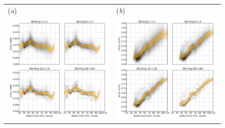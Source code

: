 \documentclass[preprint]{aastex}
\begin{document}
\begin{figure}[p]
  \begin{tabular}{ll}
    (\textit{a}) & (\textit{b}) \\
    \includegraphics{rnii-vs-radius-binning-new} &
    \includegraphics{rsii-vs-radius-binning-new} \\

\end{tabular}
\end{figure}
\end{document}
